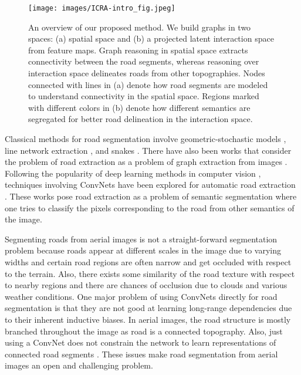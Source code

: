 \documentclass[letterpaper, 10 pt, conference]{ieeeconf}
\begin{document}
\begin{figure}[t]
	\centering
	\texttt{[image: images/ICRA-intro\_fig.jpeg]}
    \vskip-10pt	
    \caption{An overview of our proposed method. We build graphs in two spaces: (a) spatial space and (b) a projected latent interaction space from feature maps. Graph reasoning in spatial space extracts connectivity between the road segments, whereas reasoning over interaction space delineates roads from other topographies. Nodes connected with lines in (a) denote how road segments are modeled to understand connectivity in the spatial space. Regions marked with different colors in (b) denote how different semantics are segregated for better road delineation in the interaction space.
	}
	\label{roadintro}
\end{figure}

Classical methods for road segmentation involve geometric-stochastic models \cite{barzohar1996automatic, vitor2014probabilistic}, line network extraction \cite{chai2013recovering}, and snakes \cite{laptev2000automatic}. There have also been works that consider the problem of road extraction as a problem of graph extraction from images \cite{hu2007road,hinz2003automatic}. Following the popularity of deep learning methods in computer vision \cite{krizhevsky2012imagenet,he2016deep}, techniques involving ConvNets have been explored for automatic road extraction \cite{mattyus2017deeproadmapper,mendes2016exploiting,costea2016aerial,bastani2018roadtracer}. These works pose road extraction as a problem of semantic segmentation where one tries to classify the pixels corresponding to the road from other semantics of the image.

Segmenting roads from aerial images is not a straight-forward segmentation problem because roads appear at different scales in the image due to varying widths and certain road regions are often narrow and get occluded with respect to the terrain. Also, there exists some similarity of the road texture with respect to nearby regions and there are chances of occlusion due to clouds and various weather conditions. One major problem of using ConvNets directly for road segmentation is that they are not good at learning long-range dependencies due to their inherent inductive biases. In aerial images, the road structure is mostly branched throughout the image as road is a connected topography. Also, just using a ConvNet does not constrain the network to learn representations of connected road segments \cite{mosinska2018beyond}. These issues make road segmentation from aerial images an open and challenging problem.
\end{document}

